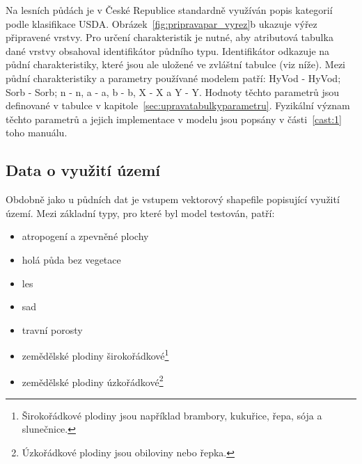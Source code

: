 Na lesních půdách je v České Republice standardně využíván popis kategorií podle klasifikace USDA.
Obrázek~\ref{fig:pripravapar_vyrez}b ukazuje výřez připravené vrstvy. Pro určení charakteristik je nutné, aby atributová tabulka dané vrstvy obsahoval identifikátor půdního typu. Identifikátor odkazuje na půdní charakteristiky, které jsou ale uložené ve zvláštní tabulce (viz níže). Mezi půdní charakteristiky a parametry používané modelem patří: \acs{HyVod} - \acl{HyVod}; \acs{Sorb} - \acl{Sorb}; \acs{n} - \acl{n},  \acs{a} - \acl{a}, \acs{b} - \acl{b}, \acs{X} - \acl{X} a  \acs{Y} - \acl{Y}. Hodnoty těchto parametrů jsou definované v tabulce v kapitole~\ref{sec:upravatabulkyparametru}. Fyzikální význam těchto parametrů a jejich implementace v modelu jsou popsány v části~\ref{cast:1} toho manuálu. 


% 
%  
 
 
 
 
 
 
 
 
 
 
 
 
 
 
 
\subsection{Data o využití území} \label{sec:vstupvegetace}
Obdobně jako u půdních dat je vstupem vektorový shapefile popisující využití území. Mezi základní typy, pro které byl model testován, patří:
\begin{itemize} \itemsep -3pt
  \item atropogení a zpevněné plochy  
  \item holá půda bez vegetace
  \item les
  \item sad
  \item travní porosty
  \item zemědělské plodiny širokořádkové\footnote{Širokořádkové plodiny jsou například brambory, kukuřice, řepa, sója a slunečnice.}
  \item zemědělské plodiny úzkořádkové\footnote{Úzkořádkové plodiny jsou obiloviny nebo řepka.}
\end{itemize}


